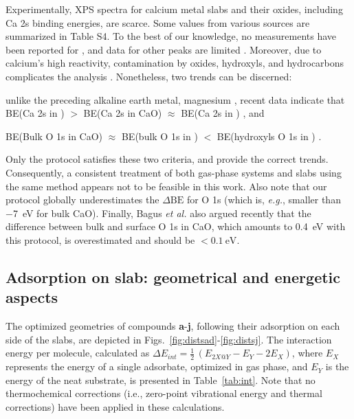 \documentclass[journal=jpccck,manuscript=article]{achemso}
\def\dbe{\ensuremath{\Delta\text{BE}}}
\begin{document}
Experimentally, XPS spectra for calcium metal slabs and their oxides, including Ca 2s binding energies, are scarce. Some values from various sources are summarized in Table S4. To the best of our knowledge, no measurements have been reported for , and data for other peaks are limited \cite{franzenXPSSpectraCrystalline1977,sveinbjornssonIonicConductivityFormation2014}. Moreover, due to calcium's high reactivity, contamination by oxides, hydroxyls, and hydrocarbons complicates the analysis \cite{dupinSystematicXPSStudies2000,bebenseeAdsorptionOxygenWater2008,fujimoriInteractionWaterCaO2016a,cristXPSLibraryWebsite2021a}. Nonetheless, two trends can be discerned: \begin{inparaenum}[(i)]
	\item unlike the preceding alkaline earth metal, magnesium \cite{dobrovolskyXPSStudyInfluence2017}, recent data indicate that BE(Ca 2s in ) $>$ BE(Ca 2s in CaO) $\approx$ BE(Ca 2s in ) \cite{ochsCO2ChemisorptionCa1998,cristHandbookMonochromaticXPS2000a,cristXPSLibraryWebsite2021a}, and 
	\item BE(Bulk O 1s in CaO) $\approx$ BE(bulk O 1s in ) $<$ BE(hydroxyls O 1s in ) \cite{dupinSystematicXPSStudies2000,bebenseeAdsorptionOxygenWater2008,fujimoriInteractionWaterCaO2016a,cristXPSLibraryWebsite2021a}.
\end{inparaenum}
Only the  protocol satisfies these two criteria, and provide the correct trends. Consequently, a consistent treatment of both gas-phase systems and slabs using the same method appears not to be feasible in this work. Also note that our protocol globally underestimates the \dbe{} for O 1s (which is, \textit{e.g.}, smaller than \SI{-7}{\electronvolt} for bulk CaO\cite{cristXPSLibraryWebsite2021a}). Finally, Bagus \emph{et al.}\cite{bagusRevisitingSurfaceCorelevel2019} also argued recently that the difference between bulk and surface O 1s in CaO, which amounts to \SI{0.4}{\electronvolt} with this protocol, is overestimated  and should be $<\SI{0.1}{\electronvolt}$.



\clearpage

\subsection{Adsorption on slab: geometrical and energetic aspects}\label{sec:geom}

The optimized geometries of compounds \textbf{a}-\textbf{j}, following their adsorption on each side of the slabs, are depicted in Figs.~\ref{fig:distsad}-\ref{fig:distsj}. The interaction energy per molecule, calculated as $\Delta E_{int} = \frac{1}{2}\,(E_{2X@Y} - E_Y - 2E_X)$, where $E_X$ represents the energy of a single adsorbate, optimized in gas phase, and $E_Y$ is the energy of the neat substrate, is presented in Table~\ref{tab:int}. Note that no thermochemical corrections (i.e., zero-point vibrational energy and thermal corrections) have been applied in these calculations.
\end{document}
